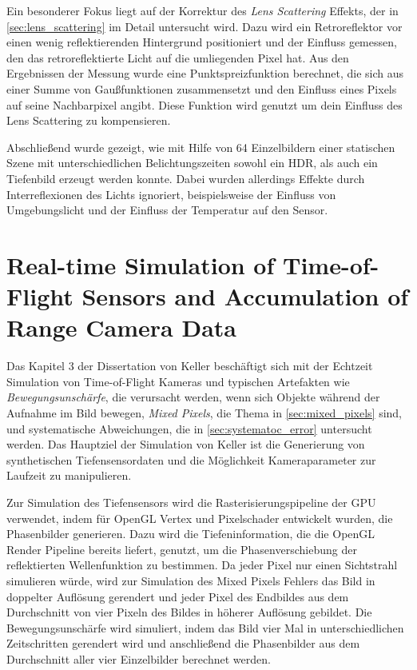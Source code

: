 \documentclass[thesis.tex]{subfiles}
\begin{document}
Ein besonderer Fokus liegt auf der Korrektur des \emph{Lens Scattering} Effekts, der in \autoref{sec:lens_scattering} im Detail untersucht wird. Dazu wird ein Retroreflektor vor einen wenig reflektierenden Hintergrund positioniert und der Einfluss gemessen, den das retroreflektierte Licht auf die umliegenden Pixel hat. Aus den Ergebnissen der Messung wurde eine Punktspreizfunktion berechnet, die sich aus einer Summe von Gaußfunktionen zusammensetzt und den Einfluss eines Pixels auf seine Nachbarpixel angibt. Diese Funktion wird genutzt um dein Einfluss des Lens Scattering zu kompensieren.

Abschließend wurde gezeigt, wie mit Hilfe von 64 Einzelbildern einer statischen Szene mit unterschiedlichen Belichtungszeiten sowohl ein HDR, als auch ein Tiefenbild erzeugt werden konnte. Dabei wurden allerdings Effekte durch Interreflexionen des Lichts ignoriert, beispielsweise der Einfluss von Umgebungslicht und der Einfluss der Temperatur auf den Sensor.

\section{Real-time Simulation of Time-of-Flight Sensors and Accumulation of Range Camera Data}

Das Kapitel 3 der Dissertation von Keller \cite{bib:Keller2015} beschäftigt sich mit der Echtzeit Simulation von Time-of-Flight Kameras und typischen Artefakten wie \emph{Bewegungsunschärfe}, die verursacht werden, wenn sich Objekte während der Aufnahme im Bild bewegen, \emph{Mixed Pixels}, die Thema in \autoref{sec:mixed_pixels} sind, und systematische Abweichungen, die in \autoref{sec:systematoc_error} untersucht werden. Das Hauptziel der Simulation von Keller ist die Generierung von synthetischen Tiefensensordaten und die Möglichkeit Kameraparameter zur Laufzeit zu manipulieren. 

Zur Simulation des Tiefensensors wird die Rasterisierungspipeline der GPU verwendet, indem für OpenGL Vertex und Pixelschader entwickelt wurden, die Phasenbilder generieren. Dazu wird die Tiefeninformation, die die OpenGL Render Pipeline bereits liefert, genutzt, um die Phasenverschiebung der reflektierten Wellenfunktion zu bestimmen. Da jeder Pixel nur einen Sichtstrahl simulieren würde, wird zur Simulation des Mixed Pixels Fehlers das Bild in doppelter Auflösung gerendert und jeder Pixel des Endbildes aus dem Durchschnitt von vier Pixeln des Bildes in höherer Auflösung gebildet. Die Bewegungsunschärfe wird simuliert, indem das Bild vier Mal in unterschiedlichen Zeitschritten gerendert wird und anschließend die Phasenbilder aus dem Durchschnitt aller vier Einzelbilder berechnet werden.
\end{document}

